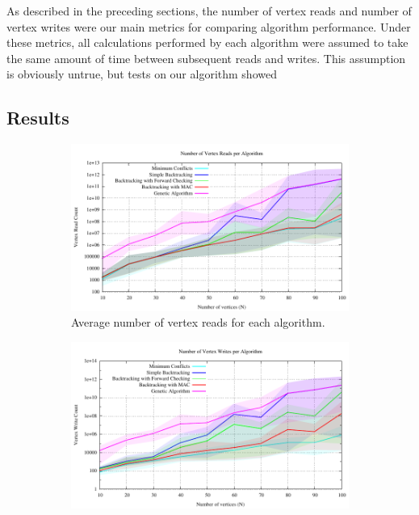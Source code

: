 \documentclass{article}
\begin{document}
	As described in the preceding sections, the number of vertex reads and number of vertex writes were our main metrics for comparing algorithm performance. Under these metrics, all calculations performed by each algorithm were assumed to take the same amount of time between subsequent reads and writes. This assumption is obviously untrue, but tests on our algorithm showed 
	
	\subsection{Results}
	
		\begin{figure}
			\centering
			\begin{subfigure}{0.49\textwidth}
				\centering
				\includegraphics[width=\textwidth]{../results_5/comparing_read_performance}
				\caption{Average number of vertex reads for each algorithm.}
			\end{subfigure}
			\;
			\begin{subfigure}{0.49\textwidth}
				\centering
				\includegraphics[width=\textwidth]{../results_5/comparing_write_performance}

\end{subfigure}
\end{figure}
\end{document}
